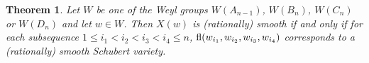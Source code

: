 \documentclass[11pt, reqno]{amsart}
\newtheorem{Thm}{Theorem}[section]
\theoremstyle{definition}
\numberwithin{equation}{section}
\begin{document}
\begin{Thm}\label{t:classical.patterns}{\rm \cite{BP-05}}
Let $W$ be one of the Weyl groups $W(A_{n-1})$, $W(B_{n})$, $W(C_{n})$ or
$W(D_{n})$ and let $w \in W$.  
Then $X(w)$ is (rationally) smooth if and
only if for each subsequence $1\leq i_1<i_2<i_3 <i_4 \leq n$,
${\rm fl}(w_{i_1},w_{i_2},w_{i_3},w_{i_4})$ corresponds to a (rationally)
smooth Schubert variety.
\end{Thm}











        
\end{document}

